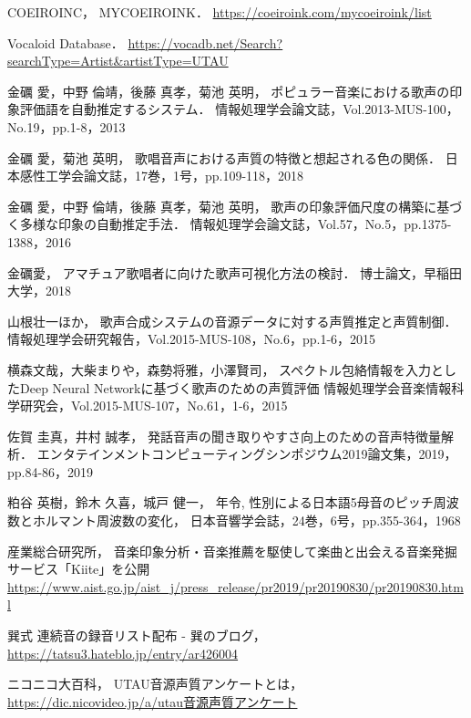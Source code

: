\thispagestyle{myheadings}

\begin{thebibliography}{参考文献}

COEIROINC，
MYCOEIROINK．
\url{https://coeiroink.com/mycoeiroink/list}

Vocaloid Database．
\url{https://vocadb.net/Search?searchType=Artist&artistType=UTAU}

金礪 愛，中野 倫靖，後藤 真孝，菊池 英明，
ポピュラー音楽における歌声の印象評価語を自動推定するシステム．
情報処理学会論文誌，Vol.2013-MUS-100，No.19，pp.1-8，2013

金礪 愛，菊池 英明，
歌唱音声における声質の特徴と想起される色の関係．
日本感性工学会論文誌，17巻，1号，pp.109-118，2018

金礪 愛，中野 倫靖，後藤 真孝，菊池 英明，
歌声の印象評価尺度の構築に基づく多様な印象の自動推定手法．
情報処理学会論文誌，Vol.57，No.5，pp.1375-1388，2016

金礪愛，
アマチュア歌唱者に向けた歌声可視化方法の検討．
博士論文，早稲田大学，2018

山根壮一ほか，
歌声合成システムの音源データに対する声質推定と声質制御．
情報処理学会研究報告，Vol.2015-MUS-108，No.6，pp.1-6，2015

横森文哉，大柴まりや，森勢将雅，小澤賢司，
スペクトル包絡情報を入力としたDeep Neural Networkに基づく歌声のための声質評価
情報処理学会音楽情報科学研究会，Vol.2015-MUS-107，No.61，1-6，2015

佐賀 圭真，井村 誠孝，
発話音声の聞き取りやすさ向上のための音声特徴量解析．
エンタテインメントコンピューティングシンポジウム2019論文集，2019，pp.84-86，2019

粕谷 英樹，鈴木 久喜，城戸 健一，
年令, 性別による日本語5母音のピッチ周波数とホルマント周波数の変化，
日本音響学会誌，24巻，6号，pp.355-364，1968

産業総合研究所，
音楽印象分析・音楽推薦を駆使して楽曲と出会える音楽発掘サービス「Kiite」を公開
\url{https://www.aist.go.jp/aist_j/press_release/pr2019/pr20190830/pr20190830.html}

巽式 連続音の録音リスト配布 - 巽のブログ，
\url{https://tatsu3.hateblo.jp/entry/ar426004}

ニコニコ大百科，
UTAU音源声質アンケートとは，
\url{https://dic.nicovideo.jp/a/utau音源声質アンケート}

\end{thebibliography}
